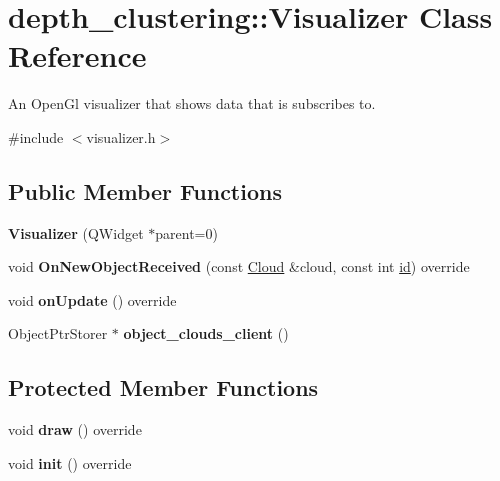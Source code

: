 \hypertarget{classdepth__clustering_1_1Visualizer}{\section{depth\-\_\-clustering\-:\-:Visualizer Class Reference}
\label{classdepth__clustering_1_1Visualizer}
}


An Open\-Gl visualizer that shows data that is subscribes to.  




{\ttfamily \#include $<$visualizer.\-h$>$}

\subsection*{Public Member Functions}
\begin{DoxyCompactItemize}
\item 
\hypertarget{classdepth__clustering_1_1Visualizer_aa7c3d468a72527994fc8eac0389c9369}{{\bfseries Visualizer} (Q\-Widget $\ast$parent=0)}\label{classdepth__clustering_1_1Visualizer_aa7c3d468a72527994fc8eac0389c9369}

\item 
\hypertarget{classdepth__clustering_1_1Visualizer_a5aeab607107e2b42e40d96e05d3ed36e}{void {\bfseries On\-New\-Object\-Received} (const \hyperlink{classdepth__clustering_1_1Cloud}{Cloud} \&cloud, const int \hyperlink{classdepth__clustering_1_1Identifiable_a020b49a5102a2ef0eec7b9e74add7669}{id}) override}\label{classdepth__clustering_1_1Visualizer_a5aeab607107e2b42e40d96e05d3ed36e}

\item 
\hypertarget{classdepth__clustering_1_1Visualizer_a06efdb4138b9c8537c60fc01cc30dd05}{void {\bfseries on\-Update} () override}\label{classdepth__clustering_1_1Visualizer_a06efdb4138b9c8537c60fc01cc30dd05}

\item 
\hypertarget{classdepth__clustering_1_1Visualizer_add585ccad73669030843a3f66931431b}{Object\-Ptr\-Storer $\ast$ {\bfseries object\-\_\-clouds\-\_\-client} ()}\label{classdepth__clustering_1_1Visualizer_add585ccad73669030843a3f66931431b}

\end{DoxyCompactItemize}
\subsection*{Protected Member Functions}
\begin{DoxyCompactItemize}
\item 
\hypertarget{classdepth__clustering_1_1Visualizer_aff24496097689cf5ff68e16ea19089c0}{void {\bfseries draw} () override}\label{classdepth__clustering_1_1Visualizer_aff24496097689cf5ff68e16ea19089c0}

\item 
\hypertarget{classdepth__clustering_1_1Visualizer_a245dd1bc0064389a470a1fc83208bd1a}{void {\bfseries init} () override}\label{classdepth__clustering_1_1Visualizer_a245dd1bc0064389a470a1fc83208bd1a}

\end{DoxyCompactItemize}
